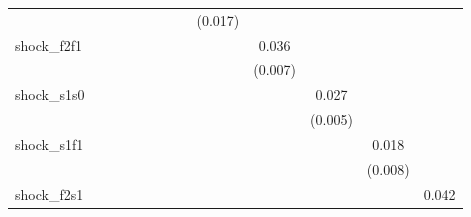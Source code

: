 {\begin{tabular}{l*{12}{c}}
            &                     &                     &                     &                     &                     &                     &                     &     (0.017)         &                     &                     &                     &                     \\
\addlinespace
shock\_f2f1  &                     &                     &                     &                     &                     &                     &                     &                     &       0.036\sym{***}&                     &                     &                     \\
            &                     &                     &                     &                     &                     &                     &                     &                     &     (0.007)         &                     &                     &                     \\
\addlinespace
shock\_s1s0  &                     &                     &                     &                     &                     &                     &                     &                     &                     &       0.027\sym{***}&                     &                     \\
            &                     &                     &                     &                     &                     &                     &                     &                     &                     &     (0.005)         &                     &                     \\
\addlinespace
shock\_s1f1  &                     &                     &                     &                     &                     &                     &                     &                     &                     &                     &       0.018\sym{**} &                     \\
            &                     &                     &                     &                     &                     &                     &                     &                     &                     &                     &     (0.008)         &                     \\
\addlinespace
shock\_f2s1  &                     &                     &                     &                     &                     &                     &                     &                     &                     &                     &                     &       0.042\sym{***}\\

\end{tabular}}
